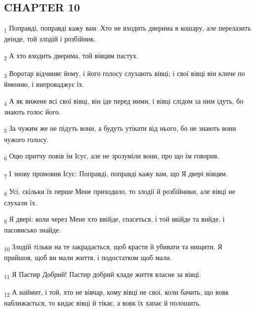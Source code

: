 \subsection{CHAPTER 10}
\begin{tcolorbox}
\textsubscript{1} Поправді, поправді кажу вам: Хто не входить дверима в кошару, але перелазить деінде, той злодій і розбійник.
\end{tcolorbox}
\begin{tcolorbox}
\textsubscript{2} А хто входить дверима, той вівцям пастух.
\end{tcolorbox}
\begin{tcolorbox}
\textsubscript{3} Воротар відчиняє йому, і його голосу слухають вівці; і свої вівці він кличе по йменню, і випроваджує їх.
\end{tcolorbox}
\begin{tcolorbox}
\textsubscript{4} А як вижене всі свої вівці, він іде перед ними, і вівці слідом за ним ідуть, бо знають голос його.
\end{tcolorbox}
\begin{tcolorbox}
\textsubscript{5} За чужим же не підуть вони, а будуть утікати від нього, бо не знають вони чужого голосу.
\end{tcolorbox}
\begin{tcolorbox}
\textsubscript{6} Оцю притчу повів їм Ісус, але не зрозуміли вони, про що їм говорив.
\end{tcolorbox}
\begin{tcolorbox}
\textsubscript{7} І знову промовив Ісус: Поправді, поправді кажу вам, що Я двері вівцям.
\end{tcolorbox}
\begin{tcolorbox}
\textsubscript{8} Усі, скільки їх перше Мене приходило, то злодії й розбійники, але вівці не слухали їх.
\end{tcolorbox}
\begin{tcolorbox}
\textsubscript{9} Я двері: коли через Мене хто ввійде, спасеться, і той ввійде та вийде, і пасовисько знайде.
\end{tcolorbox}
\begin{tcolorbox}
\textsubscript{10} Злодій тільки на те закрадається, щоб красти й убивати та нищити. Я прийшов, щоб ви мали життя, і подостатком щоб мали.
\end{tcolorbox}
\begin{tcolorbox}
\textsubscript{11} Я Пастир Добрий! Пастир добрий кладе життя власне за вівці.
\end{tcolorbox}
\begin{tcolorbox}
\textsubscript{12} А наймит, і той, хто не вівчар, кому вівці не свої, коли бачить, що вовк наближається, то кидає вівці й тікає, а вовк їх хапає й полошить.
\end{tcolorbox}
